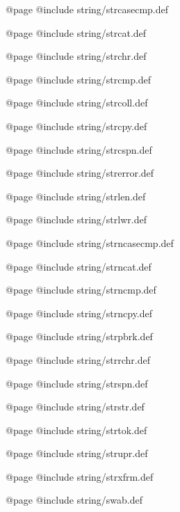 @page
@include string/strcasecmp.def

@page
@include string/strcat.def

@page
@include string/strchr.def

@page
@include string/strcmp.def

@page
@include string/strcoll.def

@page
@include string/strcpy.def

@page
@include string/strcspn.def

@page
@include string/strerror.def

@page
@include string/strlen.def

@page
@include string/strlwr.def

@page
@include string/strncasecmp.def

@page
@include string/strncat.def

@page
@include string/strncmp.def

@page
@include string/strncpy.def

@page
@include string/strpbrk.def

@page
@include string/strrchr.def

@page
@include string/strspn.def

@page
@include string/strstr.def

@page
@include string/strtok.def

@page
@include string/strupr.def

@page
@include string/strxfrm.def

@page
@include string/swab.def
